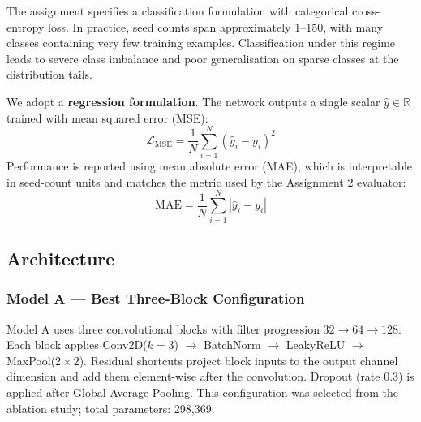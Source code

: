 \documentclass[11pt,a4paper]{article}
\begin{document}
The assignment specifies a classification formulation with categorical cross-entropy loss.
In practice, seed counts span approximately 1--150, with many classes containing very few
training examples. Classification under this regime leads to severe class imbalance and
poor generalisation on sparse classes at the distribution tails.

We adopt a \textbf{regression formulation}. The network outputs a single scalar
$\hat{y} \in \mathbb{R}$ trained with mean squared error (MSE):
\begin{equation}
  \mathcal{L}_{\text{MSE}} = \frac{1}{N}\sum_{i=1}^{N}(\hat{y}_i - y_i)^2
\end{equation}
Performance is reported using mean absolute error (MAE), which is interpretable in
seed-count units and matches the metric used by the Assignment 2 evaluator:
\begin{equation}
  \text{MAE} = \frac{1}{N}\sum_{i=1}^{N}|\hat{y}_i - y_i|
\end{equation}

\subsection{Architecture}

\subsubsection{Model A --- Best Three-Block Configuration}

Model A uses three convolutional blocks with filter progression $32 \to 64 \to 128$.
Each block applies Conv2D($k=3$) $\to$ BatchNorm $\to$ LeakyReLU $\to$ MaxPool($2\times2$).
Residual shortcuts project block inputs to the output channel dimension and add them
element-wise after the convolution. Dropout (rate 0.3) is applied after Global Average
Pooling. This configuration was selected from the ablation study; total parameters: 298,369.
\end{document}
